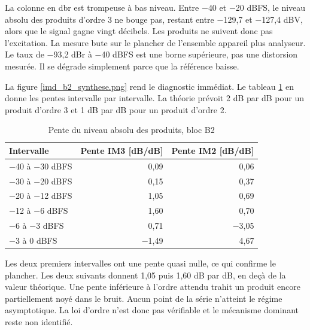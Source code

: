 La colonne en \gls{dbr} est trompeuse à bas niveau. Entre $-$40 et $-$20 dBFS, le niveau absolu des produits d'ordre 3 ne bouge pas, restant entre $-$129,7 et $-$127,4 dBV, alors que le signal gagne vingt décibels. Les produits ne suivent donc pas l'excitation. La mesure bute sur le plancher de l'ensemble appareil plus analyseur. Le taux de $-$93,2 dBr à $-$40 dBFS est une borne supérieure, pas une distorsion mesurée. Il se dégrade simplement parce que la référence baisse.


La figure \ref{imd_b2_synthese.png} rend le diagnostic immédiat. Le tableau \ref{tab:imd_b2_pente} en donne les pentes intervalle par intervalle. La théorie prévoit 2 dB par dB pour un produit d'ordre 3 et 1 dB par dB pour un produit d'ordre 2.

\begin{table}[H]
    \centering
    \caption{Pente du niveau absolu des produits, bloc B2}
    \label{tab:imd_b2_pente}
    \small
    \begin{tabular}{lrr}
        \toprule
        Intervalle         & Pente IM3 [dB/dB] & Pente IM2 [dB/dB] \\
        \midrule
        $-$40 à $-$30 dBFS & 0,09              & 0,06              \\
        $-$30 à $-$20 dBFS & 0,15              & 0,37              \\
        $-$20 à $-$12 dBFS & 1,05              & 0,69              \\
        $-$12 à $-$6 dBFS  & 1,60              & 0,70              \\
        $-$6 à $-$3 dBFS   & 0,71              & $-$3,05           \\
        $-$3 à 0 dBFS      & $-$1,49           & 4,67              \\
        \bottomrule
    \end{tabular}
\end{table}

Les deux premiers intervalles ont une pente quasi nulle, ce qui confirme le plancher. Les deux suivants donnent 1,05 puis 1,60 dB par dB, en deçà de la valeur théorique. Une pente inférieure à l'ordre attendu trahit un produit encore partiellement noyé dans le bruit. Aucun point de la série n'atteint le régime asymptotique. La loi d'ordre n'est donc pas vérifiable et le mécanisme dominant reste non identifié.

